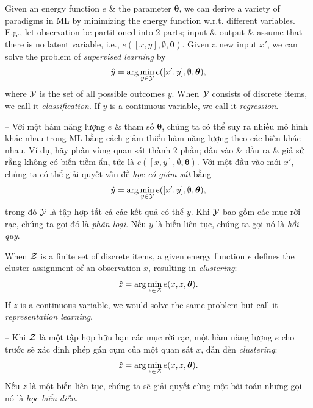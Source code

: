 \documentclass{article}
\begin{document}
Given an energy function $e$ \& the parameter $\boldsymbol{\theta}$, we can derive a variety of paradigms in ML by minimizing the energy function w.r.t. different variables. E.g., let observation be partitioned into 2 parts; input \& output \& assume that there is no latent variable, i.e., $e([x,y],\emptyset,\boldsymbol{\theta})$. Given a new input $x'$, we can solve the problem of {\it supervised learning} by
\begin{equation*}
	\hat{y} = \arg\min_{y\in{\cal Y}} e([x',y],\emptyset,\boldsymbol{\theta}),
\end{equation*}
where ${\cal Y}$ is the set of all possible outcomes $y$. When ${\cal Y}$ consists of discrete items, we call it {\it classification}. If $y$ is a continuous variable, we call it {\it regression}.

-- Với một hàm năng lượng $e$ \& tham số $\boldsymbol{\theta}$, chúng ta có thể suy ra nhiều mô hình khác nhau trong ML bằng cách giảm thiểu hàm năng lượng theo các biến khác nhau. Ví dụ, hãy phân vùng quan sát thành 2 phần; đầu vào \& đầu ra \& giả sử rằng không có biến tiềm ẩn, tức là $e([x,y],\emptyset,\boldsymbol{\theta})$. Với một đầu vào mới $x'$, chúng ta có thể giải quyết vấn đề {\it học có giám sát} bằng
\begin{equation*}
	\hat{y} = \arg\min_{y\in{\cal Y}} e([x',y],\emptyset,\boldsymbol{\theta}),
\end{equation*}
trong đó ${\cal Y}$ là tập hợp tất cả các kết quả có thể $y$. Khi ${\cal Y}$ bao gồm các mục rời rạc, chúng ta gọi đó là {\it phân loại}. Nếu $y$ là biến liên tục, chúng ta gọi nó là {\it hồi quy}.

When ${\cal Z}$ is a finite set of discrete items, a given energy function $e$ defines the cluster assignment of an observation $x$, resulting in {\it clustering}:
\begin{equation*}
	\hat{z} = \arg\min_{z\in{\cal Z}} e(x,z,\boldsymbol{\theta}).
\end{equation*}
If $z$ is a continuous variable, we would solve the same problem but call it {\it representation learning}.

-- Khi ${\cal Z}$ là một tập hợp hữu hạn các mục rời rạc, một hàm năng lượng $e$ cho trước sẽ xác định phép gán cụm của một quan sát $x$, dẫn đến {\it clustering}:
\begin{equation*}
	\hat{z} = \arg\min_{z\in{\cal Z}} e(x,z,\boldsymbol{\theta}).
\end{equation*}
Nếu $z$ là một biến liên tục, chúng ta sẽ giải quyết cùng một bài toán nhưng gọi nó là {\it học biểu diễn}.
\end{document}
